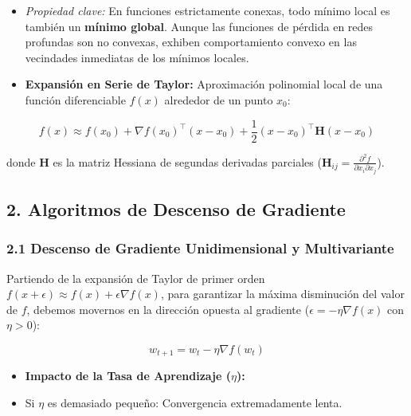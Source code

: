 \documentclass[11pt,oneside]{article}
\begin{document}
\begin{itemize}

\item \emph{Propiedad clave:} En funciones estrictamente conexas, todo mínimo local es también un \textbf{mínimo global}. Aunque las funciones de pérdida en redes profundas son no convexas, exhiben comportamiento convexo en las vecindades inmediatas de los mínimos locales.

\end{itemize}

\begin{itemize}

\item \textbf{Expansión en Serie de Taylor:} Aproximación polinomial local de una función diferenciable \(f(x)\) alrededor de un punto \(x_0\):

\end{itemize}

\[f(x) \approx f(x_0) + \nabla f(x_0)^\top (x - x_0) + \frac{1}{2}(x - x_0)^\top \mathbf{H}(x - x_0)\]

donde \(\mathbf{H}\) es la matriz Hessiana de segundas derivadas parciales (\(\mathbf{H}_{ij} = \frac{\partial^2 f}{\partial x_i \partial x_j}\)).

\subsection{2. Algoritmos de Descenso de Gradiente}

\subsubsection{2.1 Descenso de Gradiente Unidimensional y Multivariante}

Partiendo de la expansión de Taylor de primer orden \(f(x + \epsilon) \approx f(x) + \epsilon \nabla f(x)\), para garantizar la máxima disminución del valor de \(f\), debemos movernos en la dirección opuesta al gradiente (\(\epsilon = -\eta \nabla f(x)\) con \(\eta > 0\)):

\[w_{t+1} = w_t - \eta \nabla f(w_t)\]

\begin{itemize}

\item \textbf{Impacto de la Tasa de Aprendizaje (\(\eta\)):}

\item Si \(\eta\) es demasiado pequeño: Convergencia extremadamente lenta.

\end{itemize}
\end{document}
